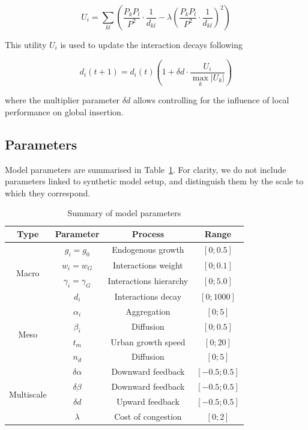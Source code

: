 \documentclass[referee,lineno,pdflatex,sn-apa]{sn-jnl}
\begin{document}
\begin{equation}
\label{eq:eq7}
		U_i = \sum_{kl} \left( \frac{P_k P_l}{P^2} \cdot \frac{1}{d_{kl}} - \lambda \left(\frac{P_k P_l}{P^2} \cdot \frac{1}{d_{kl}}\right)^2 \right)
\end{equation}
	
This utility $U_i$ is used to update the interaction decays following
	
\begin{equation}
	d_i (t+1) = d_i (t) \left( 1 + \delta d \cdot \frac{U_i}{\max_k \lvert U_k \rvert } \right) \label{eq:eq8}
\end{equation}

where the multiplier parameter $\delta d$ allows controlling for the influence of local performance on global insertion.





\subsection{Parameters}

Model parameters are summarised in Table~\ref{tab:parameters}. For clarity, we do not include parameters linked to synthetic model setup, and distinguish them by the scale to which they correspond.
	
\begin{table}[h]
	\caption{Summary of model parameters\label{tab:parameters}}
	\centering
	\begin{tabular}{|c|c|c|c|}
	\hline
		Type & Parameter & Process & Range \\\hline
		\multirow{4}{*}{Macro} & $g_i = g_0$ & Endogenous growth & $\left[0 ; 0.5\right]$ \\
		& $w_i = w_G$ & Interactions weight & $\left[0 ; 0.1\right]$ \\
		& $\gamma_i = \gamma_G$ & Interactions hierarchy & $\left[0 ; 5.0\right]$ \\
		& $d_i$ & Interactions decay & $\left[0 ; 1000\right]$ \\ \hline
		\multirow{4}{*}{Meso} & $\alpha_i$ & Aggregation & $\left[0 ; 5\right]$ \\
		& $\beta_i$ & Diffusion & $\left[0 ; 0.5\right]$ \\
		& $t_m$ & Urban growth speed & $\left[0 ; 20\right]$ \\
		& $n_d$ & Diffusion & $\left[0 ; 5\right]$ \\ \hline
		\multirow{4}{*}{Multiscale} & $\delta\alpha$ & Downward feedback & $\left[-0.5 ; 0.5\right]$ \\
		& $\delta\beta$ & Downward feedback & $\left[-0.5 ; 0.5\right]$ \\
		& $\delta d$ & Upward feedback & $\left[-0.5 ; 0.5\right]$ \\
		& $\lambda$ & Cost of congestion & $\left[0 ; 2\right]$ \\\hline
	\end{tabular}
\end{table}
\end{document}
